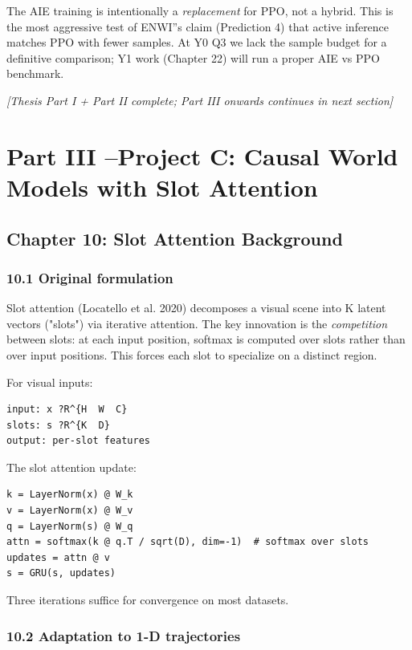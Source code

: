 \documentclass[11pt]{article}
\begin{document}
The AIE training is intentionally a \textit{replacement} for PPO, not a hybrid. This is
the most aggressive test of ENWI''s claim (Prediction 4) that active inference
matches PPO with fewer samples. At Y0 Q3 we lack the sample budget for a
definitive comparison; Y1 work (Chapter 22) will run a proper AIE vs PPO
benchmark.

\hrulefill

\textit{[Thesis Part I + Part II complete; Part III onwards continues in next section]}


\section{Part III --Project C: Causal World Models with Slot Attention}

\subsection{Chapter 10: Slot Attention Background}

\subsubsection{10.1 Original formulation}

Slot attention (Locatello et al. 2020) decomposes a visual scene into K latent
vectors ("slots") via iterative attention. The key innovation is the \textit{competition}
between slots: at each input position, softmax is computed over slots rather than
over input positions. This forces each slot to specialize on a distinct region.

For visual inputs:

\begin{verbatim}
input: x ?R^{H  W  C}
slots: s ?R^{K  D}
output: per-slot features
\end{verbatim}

The slot attention update:

\begin{verbatim}
k = LayerNorm(x) @ W_k
v = LayerNorm(x) @ W_v
q = LayerNorm(s) @ W_q
attn = softmax(k @ q.T / sqrt(D), dim=-1)  # softmax over slots
updates = attn @ v
s = GRU(s, updates)
\end{verbatim}

Three iterations suffice for convergence on most datasets.

\subsubsection{10.2 Adaptation to 1-D trajectories}
\end{document}

